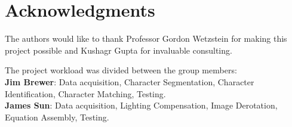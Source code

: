 \documentclass[journal]{IEEEtran}
\begin{document}
\section*{Acknowledgments}


The authors would like to thank Professor Gordon Wetzstein for making this project possible and Kushagr Gupta for invaluable consulting.

\appendix[]
The project workload was divided between the group members:\\
\textbf{Jim Brewer}: Data acquisition, Character Segmentation, Character Identification, Character Matching, Testing.\\
\textbf{James Sun}: Data acquisition, Lighting Compensation, Image Derotation, Equation Assembly, Testing.



%
%
%


\end{document}

